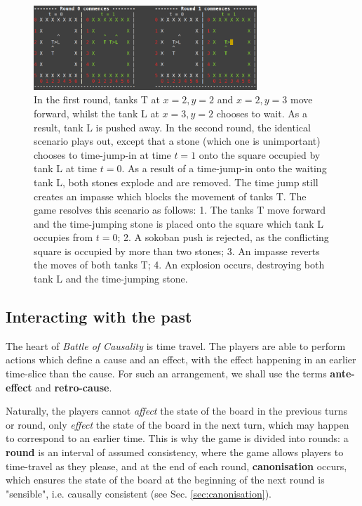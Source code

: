 \documentclass[12pt]{article}
\begin{document}
	\begin{figure}[h]
\begin{center}
    \includegraphics[width=0.75\textwidth]{images/diag_scr_2}
 \caption{In the first round, tanks T at $x=2, y=2$ and $x=2, y=3$ move forward, whilst the tank L at $x=3, y=2$ chooses to wait. As a result, tank L is pushed away. In the second round, the identical scenario plays out, except that a stone (which one is unimportant) chooses to time-jump-in at time $t=1$ onto the square occupied by tank L at time $t=0$. As a result of a time-jump-in onto the waiting tank L, both stones explode and are removed. The time jump still creates an impasse which blocks the movement of tanks T. The game resolves this scenario as follows: 1. The tanks T move forward and the time-jumping stone is placed onto the square which tank L occupies from $t = 0$; 2. A sokoban push is rejected, as the conflicting square is occupied by more than two stones; 3. An impasse reverts the moves of both tanks T; 4. An explosion occurs, destroying both tank L and the time-jumping stone.}\label{fig:scr_2}
\end{center}
\end{figure}
	
	\subsection{Interacting with the past}
	The heart of \textit{Battle of Causality} is time travel. The players are able to perform actions which define a cause and an effect, with the effect happening in an earlier time-slice than the cause. For such an arrangement, we shall use the terms \textbf{ante-effect} and \textbf{retro-cause}.
	
	Naturally, the players cannot \textit{affect} the state of the board in the previous turns or round, only \textit{effect} the state of the board in the next turn, which may happen to correspond to an earlier time. This is why the game is divided into rounds: a \textbf{round} is an interval of assumed consistency, where the game allows players to time-travel as they please, and at the end of each round, \textbf{canonisation} occurs, which ensures the state of the board at the beginning of the next round is "sensible", i.e. causally consistent (see Sec. \ref{sec:canonisation}).
	
\end{document}
